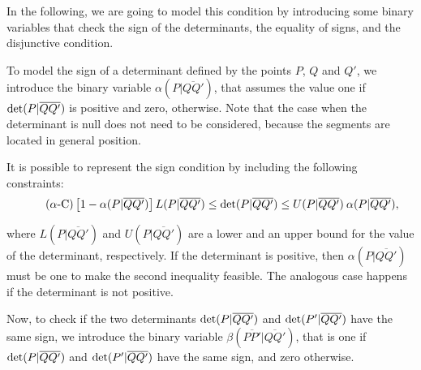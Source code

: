 \documentclass[a4paper]{elsarticle}
\begin{document}
In the following, we are going to model this condition by introducing some binary variables that check the sign of the determinants, the equality of signs, and the disjunctive condition.

\newcommand{\LS}[3]{L(#1|\overline{#2#3})}
\newcommand{\US}[3]{U(#1|\overline{#2#3})}
\newcommand{\alphamas}[3]{\alpha(#1|\overline{#2#3})}
\newcommand{\alphamenos}[3]{\alpha^{-}(#1|#2#3)}
\newcommand{\alphapunto}[3]{\alpha^{\cdotp}(#1|#2#3)}

To model the sign of a determinant defined by the points $P$, $Q$ and $Q'$, we introduce the binary variable $\alphamas{P}{Q}{Q'}$, that assumes the value one if $\det({P|\overline{QQ'}})$ is positive and zero, otherwise. Note that the case when the determinant is null does not need to be considered, because the segments are located in general position.

It is possible to represent the sign condition by including the following constraints:
\begin{equation}\tag{$\alpha$-C}\label{eq:alphaC}
\left[1-\alphamas{P}{Q}{Q'}\right]\LS{P}{Q}{Q'}\leq\determinant{P}{Q}{Q'}\leq \US{P}{Q}{Q'}\:\alphamas{P}{Q}{Q'},
\end{equation}

\noindent where $\LS{P}{Q}{Q'}$ and $\US{P}{Q}{Q'}$ are a lower and an upper bound for the value of the determinant, respectively. If the determinant is positive, then $\alphamas{P}{Q}{Q'}$ must be one to make the second inequality feasible. The analogous case happens if the determinant is not positive.

\newcommand{\betamas}[4]{\beta(\overline{#1#2}|\overline{#3#4})}

Now, to check if the two determinants $\det({P|\overline{QQ'}})$ and $\det({P'|\overline{QQ'}})$ have the same sign, we introduce the binary variable $\betamas{P}{P'}{Q}{Q'}$, that is one if $\det({P|\overline{QQ'}})$ and $\det({P'|\overline{QQ'}})$ have the same sign,  and zero otherwise.

\newcommand{\gammaprod}[4]{\gamma(\overline{#1#2}|\overline{#3#4})}
\end{document}
